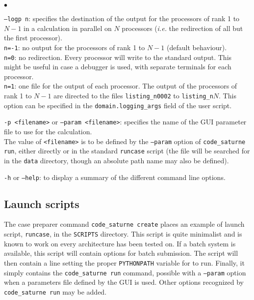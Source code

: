 {{{\begin{list}{$\bullet$}{}
\item \texttt{--logp n}: specifies the destination of the output for the
processors of rank 1 to $N-1$ in a calculation in parallel on $N$ processors
({\em i.e.} the redirection of all but the first processor).\\
\hspace*{0.5cm}\texttt{n=-1}: no output for the processors of rank 1 to $N-1$
(default behaviour).\\
\hspace*{0.5cm}\texttt{n=0}: no redirection. Every processor will write to the
standard output. This might be useful in case a debugger is used, with separate
terminals for each processor.\\
\hspace*{0.5cm}\texttt{n=1}: one file for the output of each processor. The
output of the processors of rank 1 to $N-1$ are directed to the files
\texttt{listing\_n0002} to \texttt{listing\_n$N$}.
This option can be specified in the \texttt{domain.logging\_args} field
of the user script.

\item \texttt{-p <filename>} or \texttt{--param <filename>}: specifies the name of the GUI
parameter file to use for the calculation.\\
The value of \texttt{<filename>} is to be defined by the \texttt{--param} option
of \texttt{code\_saturne run}, either directly or in the standard \texttt{runcase}
script (the file will be searched for in the \texttt{data} directory, though
an absolute path name may also be defined).

\item \texttt{-h} or \texttt{--help}: to display a summary of the different
command line options.
\end{list}

\subsection{Launch scripts}
\label{sec:prg_runcase}%

The case preparer command \texttt{code\_saturne~create} places an example of launch script,
\texttt{runcase}, in the \texttt{SCRIPTS} directory. This script is quite minimalist and is known to work on every architecture \CS has been tested on.
If a batch system is available, this script will contain options
for batch submission.
The script will then contain a line setting the proper \texttt{PYTHONPATH}
variable for \CS to run.
Finally, it simply contains the \texttt{code\_saturne run}  command,
possible with a \texttt{--param} option when a parameters file
defined by the GUI is used. Other options recognized by
\texttt{code\_saturne run} may be added.

}}}
